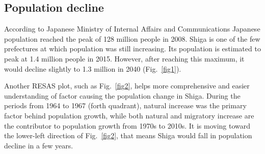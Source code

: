 \documentclass[10pt, conference, compsocconf]{IEEEtran}
\begin{document}
\subsection{Population decline}
According to Japanese Ministry of Internal Affairs and Communications Japanese population reached the peak of 128 million people in 2008.
Shiga is one of the few prefectures at which population was still increasing. Its population is estimated to peak at 1.4 million people in 2015. However, after reaching this maximum, it would decline slightly to 1.3 million in 2040 (Fig.~\ref{fig1}). 

Another RESAS plot, such as Fig.~\ref{fig2}, helps more comprehensive and easier understanding of factor causing the population change in Shiga. 
During the periods from 1964 to 1967 (forth quadrant), natural increase was the primary factor behind population growth, while both natural and migratory increase are the contributor to population growth from 1970s to 2010s. It is moving toward the lower-left direction of Fig.~\ref{fig2}, that means Shiga would fall in population decline in a few years. 
\end{document}
